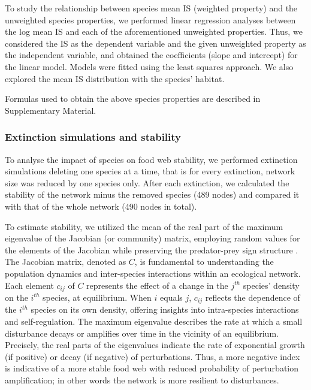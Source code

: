 \documentclass[gc, manuscript]{copernicus}
\begin{document}
To study the relationship between species mean IS (weighted property)
and the unweighted species properties, we performed linear regression
analyses between the log mean IS and each of the aforementioned
unweighted properties. Thus, we considered the IS as the dependent
variable and the given unweighted property as the independent variable,
and obtained the coefficients (slope and intercept) for the linear
model. Models were fitted using the least squares approach. We also
explored the mean IS distribution with the species' habitat.

Formulas used to obtain the above species properties are described in
Supplementary Material.

\subsubsection{Extinction simulations and stability}

To analyse the impact of species on food web stability, we performed
extinction simulations deleting one species at a time, that is for every
extinction, network size was reduced by one species only. After each
extinction, we calculated the stability of the network minus the removed
species (489 nodes) and compared it with that of the whole network (490
nodes in total).

To estimate stability, we utilized the mean of the real part of the
maximum eigenvalue of the Jacobian (or community) matrix, employing
random values for the elements of the Jacobian while preserving the
predator-prey sign structure
\citep{Saravia2022, Allesina2008, Pawar2009}. The Jacobian matrix,
denoted as \(C\), is fundamental to understanding the population
dynamics and inter-species interactions within an ecological network.
Each element \(c_{ij}\) of \(C\) represents the effect of a change in
the \(j^{th}\) species' density on the \(i^{th}\) species, at
equilibrium. When \(i\) equals \(j\), \(c_{ij}\) reflects the dependence
of the \(i^{th}\) species on its own density, offering insights into
intra-species interactions and self-regulation. The maximum eigenvalue
describes the rate at which a small disturbance decays or amplifies over
time in the vicinity of an equilibrium. Precisely, the real parts of the
eigenvalues indicate the rate of exponential growth (if positive) or
decay (if negative) of perturbations. Thus, a more negative index is
indicative of a more stable food web with reduced probability of
perturbation amplification; in other words the network is more resilient
to disturbances.
\end{document}

